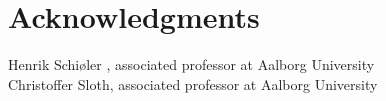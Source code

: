 \section{Acknowledgments}
Henrik Schiøler , associated professor at Aalborg University \\
Christoffer Sloth, associated professor at Aalborg University